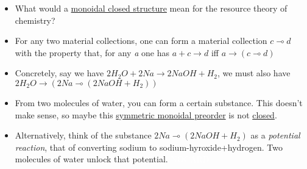 \begin{itemize}
    \item What would a \href{doc/1 math/Seven Sketches in Compositionality/Chapter 2: Resource theories/5 Computing presented V-categories with matrix mult/1 Monoidal closed preorders/1 Closed SMP}{monoidal closed structure} mean for the resource theory of chemistry?
    \item For any two material collections, one can form a material collection $c \multimap d$ with the property that, for any \emph{a} one has $a + c \rightarrow d$ iff $a \rightarrow (c \multimap d)$
    \item Concretely, say we have $2 H_2O + 2 Na \rightarrow 2 NaOH + H_2$, we must also have $2H_2O \rightarrow (2Na \multimap (2NaOH+H_2))$
    \item From two molecules of water, you can form a certain substance. This doesn't make sense, so maybe this \href{doc/1 math/Seven Sketches in Compositionality/Chapter 2: Resource theories/2 Symmetric monoidal preorders/1 Definition and first examples/1 Symmetric monoidal structure on a preorder}{symmetric monoidal preorder} is not \href{doc/1 math/Seven Sketches in Compositionality/Chapter 2: Resource theories/5 Computing presented V-categories with matrix mult/1 Monoidal closed preorders/1 Closed SMP}{closed}.
    \item Alternatively, think of the substance $2Na \multimap (2NaOH+H_2)$ as a \emph{potential reaction}, that of converting sodium to sodium-hyroxide+hydrogen. Two molecules of water unlock that potential. \textcolor{white}{NOCARD}
  \end{itemize}